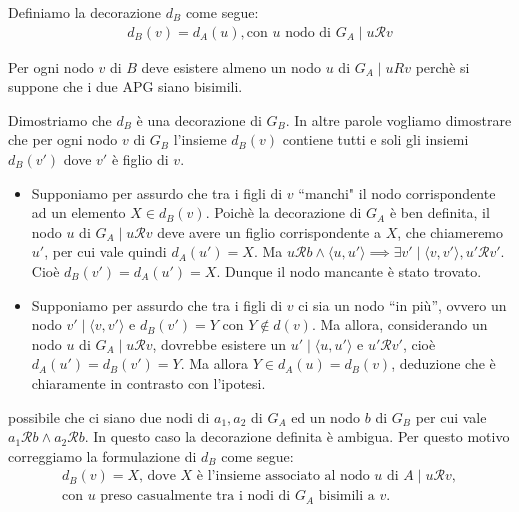 \begin{proof2}
\begin{enumerate}
              Definiamo la decorazione $d_B$ come segue:
              \begin{gather*}
                  d_B(v) = d_A(u), \text{con $u$ nodo di $G_A$} \mid u \mathcal{R} v
              \end{gather*}
              \begin{observation*}
                  Per ogni nodo $v$ di $B$ deve esistere almeno un nodo $u$ di $G_A \mid u R v$ perchè si suppone che i due APG siano bisimili.
              \end{observation*}
              Dimostriamo che $d_B$ è una decorazione di $G_B$. In altre parole vogliamo dimostrare che per ogni nodo $v$ di $G_B$ l'insieme $d_B(v)$ contiene tutti e soli gli insiemi $d_B(v')$ dove $v'$ è figlio di $v$.
              \begin{itemize}
                  \item Supponiamo per assurdo che tra i figli di $v$ ``manchi" il nodo corrispondente ad un elemento $X \in d_B(v)$. Poichè la decorazione di $G_A$ è ben definita, il nodo $u$ di $G_A \mid u \mathcal{R} v$ deve avere un figlio corrispondente a $X$, che chiameremo $u'$, per cui vale quindi $d_A(u') = X$. Ma $u \mathcal{R} b \land \langle u, u' \rangle \implies \exists v' \mid \langle v, v' \rangle, u' \mathcal{R} v'$. Cioè $d_B(v') = d_A(u') = X$. Dunque il nodo mancante è stato trovato.
                  \item Supponiamo per assurdo che tra i figli di $v$ ci sia un nodo ``in più'', ovvero un nodo $v' \mid \langle v, v' \rangle$ e $d_B(v') = Y$ con $Y \notin d(v)$. Ma allora, considerando un nodo $u$ di $G_A \mid u \mathcal{R} v$, dovrebbe esistere un $u' \mid \langle u, u' \rangle$ e $u' \mathcal{R} v'$, cioè $d_A(u') = d_B(v') = Y$.
                  Ma allora $Y \in d_A(u) = d_B(v)$, deduzione che è chiaramente in contrasto con l'ipotesi.
              \end{itemize}
              \accente possibile che ci siano due nodi di $a_1, a_2$ di $G_A$ ed un nodo $b$ di $G_B$ per cui vale $a_1 \mathcal{R} b \land a_2 \mathcal{R} b$. In questo caso la decorazione definita è ambigua. Per questo motivo correggiamo la formulazione di $d_B$ come segue:
              \begin{gather*}
                d_B(v) = X \text{, dove $X$ è l'insieme associato al nodo $u$ di $A$} \mid u \mathcal{R} v, \\
                \text{con $u$ preso casualmente tra i nodi di $G_A$ bisimili a $v$.}
              \end{gather*}

\end{enumerate}
\end{proof2}
